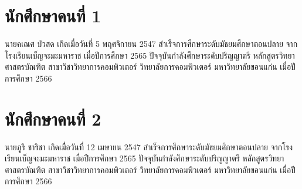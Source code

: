 
\section*{นักศึกษาคนที่ 1}

นายคเณศ บัวสด เกิดเมื่อวันที่ 5 พฤศจิกายน 2547
สำเร็จการศึกษาระดับมัธยมศึกษาตอนปลาย จากโรงเรียนเบ็ญจะมะมหาราช เมื่อปีการศึกษา 2565
ปัจจุบันกำลังศึกษาระดับปริญญาตรี หลักสูตรวิทยาศาสตรบัณฑิต
สาขาวิชาวิทยาการคอมพิวเตอร์ วิทยาลัยการคอมพิวเตอร์ มหาวิทยาลัยขอนแก่น เมื่อปีการศึกษา 2566

\section*{นักศึกษาคนที่ 2}

นายภูริ ชาริชา เกิดเมื่อวันที่ 12 เมษายน 2547
สำเร็จการศึกษาระดับมัธยมศึกษาตอนปลาย จากโรงเรียนเบ็ญจะมะมหาราช เมื่อปีการศึกษา 2565
ปัจจุบันกำลังศึกษาระดับปริญญาตรี หลักสูตรวิทยาศาสตรบัณฑิต
สาขาวิชาวิทยาการคอมพิวเตอร์ วิทยาลัยการคอมพิวเตอร์ มหาวิทยาลัยขอนแก่น เมื่อปีการศึกษา 2566
